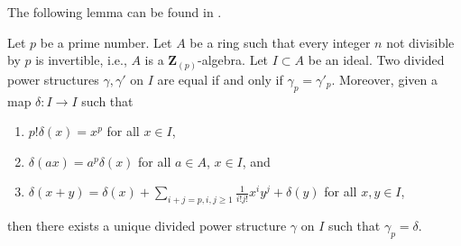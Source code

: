 \noindent
The following lemma can be found in \cite{BO}.

\begin{lemma}
\label{lemma-need-only-gamma-p}
Let $p$ be a prime number. Let $A$ be a ring such that every integer $n$
not divisible by $p$ is invertible, i.e., $A$ is a $\mathbf{Z}_{(p)}$-algebra.
Let $I \subset A$ be an ideal. Two divided power structures
$\gamma, \gamma'$ on $I$ are equal if and only if $\gamma_p = \gamma'_p$.
Moreover, given a map $\delta : I \to I$ such that
\begin{enumerate}
\item $p!\delta(x) = x^p$ for all $x \in I$,
\item $\delta(ax) = a^p\delta(x)$ for all $a \in A$, $x \in I$, and
\item
$\delta(x + y) =
\delta(x) +
\sum\nolimits_{i + j = p, i,j \geq 1} \frac{1}{i!j!} x^i y^j +
\delta(y)$ for all $x, y \in I$,
\end{enumerate}
then there exists a unique divided power structure $\gamma$ on $I$ such
that $\gamma_p = \delta$.
\end{lemma}

